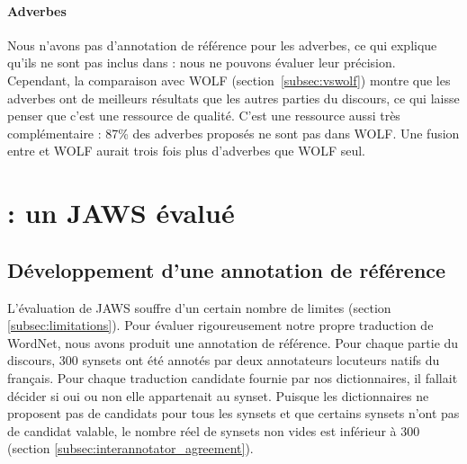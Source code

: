 \paragraph{Adverbes}

Nous n'avons pas d'annotation de référence pour les adverbes, ce qui explique qu'ils ne sont pas inclus dans \newjaws{} : nous ne pouvons évaluer leur précision. Cependant, la comparaison avec WOLF (section~\ref{subsec:vswolf}) montre que les adverbes ont de meilleurs résultats que les autres parties du discours, ce qui laisse penser que c'est une ressource de qualité. C'est une ressource aussi très complémentaire : 87\% des adverbes proposés ne sont pas dans WOLF. Une fusion entre \newjaws{} et WOLF aurait trois fois plus d'adverbes que WOLF seul.

\section{\newjaws{}: un JAWS évalué}
\label{sec:evaluating_jaws}

\subsection{Développement d'une annotation de référence}
\label{subsec:gold_standard}

L'évaluation de JAWS souffre d'un certain nombre de limites (section \ref{subsec:limitations}). Pour évaluer rigoureusement notre propre traduction de WordNet, nous avons produit une annotation de référence. Pour chaque partie du discours, 300 synsets ont été annotés par deux annotateurs locuteurs natifs du français. Pour chaque traduction candidate fournie par nos dictionnaires, il fallait décider si oui ou non elle appartenait au synset. Puisque les dictionnaires ne proposent pas de candidats pour tous les synsets et que certains synsets n'ont pas de candidat valable, le nombre réel de synsets non vides est inférieur à 300 (section \ref{subsec:interannotator_agreement}).

